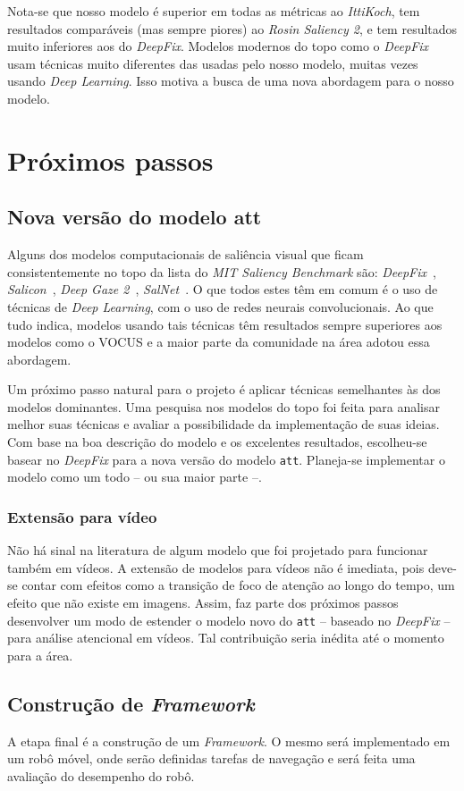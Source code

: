 \documentclass[article]{IEEEtran}
\newcommand{\tit}[1]{\textit{#1}}
\newcommand{\ttt}[1]{\texttt{#1}}
\begin{document}
Nota-se que nosso modelo é superior em todas as métricas ao \tit{IttiKoch},
tem resultados comparáveis (mas sempre piores) ao \tit{Rosin Saliency 2},
e tem resultados muito inferiores aos do \tit{DeepFix}.
Modelos modernos do topo como o \tit{DeepFix} usam técnicas muito diferentes
das usadas pelo nosso modelo, muitas vezes usando \tit{Deep Learning}.
Isso motiva a busca de uma nova abordagem para o nosso modelo.

\section{Próximos passos}
\subsection{Nova versão do modelo att}
Alguns dos modelos computacionais de saliência visual que ficam consistentemente
no topo da lista do \tit{MIT Saliency Benchmark} são:
\tit{DeepFix}~\cite{DeepFix},
\tit{Salicon}~\cite{Salicon}, \tit{Deep Gaze 2}~\cite{DeepGaze2},
\tit{SalNet}~\cite{SalNet}.
O que todos estes têm em comum é o uso de técnicas de \tit{Deep Learning},
com o uso de redes neurais convolucionais.
Ao que tudo indica, modelos usando tais técnicas têm resultados
sempre superiores aos modelos como o VOCUS e a maior parte da comunidade
na área adotou essa abordagem.

Um próximo passo natural para o projeto é aplicar técnicas semelhantes às dos
modelos dominantes.
Uma pesquisa nos modelos do topo foi feita para analisar melhor suas técnicas
e avaliar a possibilidade da implementação de suas ideias.
Com base na boa descrição do modelo e os excelentes resultados, escolheu-se
basear no \tit{DeepFix} para a nova versão do modelo \ttt{att}.
Planeja-se implementar o modelo como um todo -- ou sua maior parte --.

\subsubsection{Extensão para vídeo}
Não há sinal na literatura de algum modelo que foi projetado para funcionar
também em vídeos. A extensão de modelos para vídeos não é imediata, pois
deve-se contar com efeitos como a transição de foco de atenção ao longo do
tempo, um efeito que não existe em imagens.
Assim, faz parte dos próximos passos desenvolver um modo de estender o modelo
novo do \ttt{att} -- baseado no \tit{DeepFix} -- para análise
atencional em vídeos.
Tal contribuição seria inédita até o momento para a área.

\subsection{Construção de \tit{Framework}}
A etapa final é a construção de um \tit{Framework}.
O mesmo será implementado em um robô móvel, onde serão definidas tarefas
de navegação e será feita uma avaliação do desempenho do robô.

\printbibliography

\end{document}
